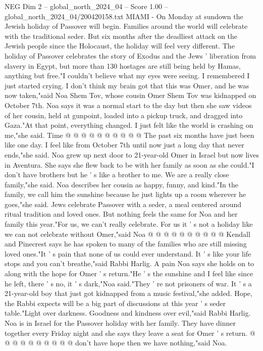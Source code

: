 \begin{textsample}{NEG Dim 2 – global\_north\_2024\_04 – Score 1.00 – global\_north\_2024\_04/200420158.txt}  \label{ex:f2_neg_282}
MIAMI - On Monday at sundown the Jewish holiday of Passover will begin.
Families around the world will celebrate with the traditional seder.
But six months after the deadliest attack on the Jewish people since the Holocaust, the holiday will feel very different.
The holiday of Passover celebrates the story of Exodus and the Jews ' liberation from slavery in Egypt, but more than 130 hostages are still being held by Hamas, anything but free."I couldn't believe what my eyes were seeing.
I remembered I just started crying.
I don't think my brain got that this was Omer, and he was now taken,"said Noa Shem Tov, whose cousin Omer Shem Tov was kidnapped on October 7th.
Noa says it was a normal start to the day but then she saw videos of her cousin, held at gunpoint, loaded into a pickup truck, and dragged into Gaza."At that point, everything changed.
I just felt like the world is crashing on me,"she said.
Time @ @ @ @ @ @ @ @ @ @ The past six months have just been like one day.
I feel like from October 7th until now just a long day that never ends,"she said.
Noa grew up next door to 21-year-old Omer in Israel but now lives in Aventura.
She says she flew back to be with her family as soon as she could."I don't have brothers but he ' s like a brother to me.
We are a really close family,"she said.
Noa describes her cousin as happy, funny, and kind."In the family, we call him the sunshine because he just lights up a room wherever he goes,"she said.
Jews celebrate Passover with a seder, a meal centered around ritual tradition and loved ones.
But nothing feels the same for Noa and her family this year."For us, we can't really celebrate.
For us it ' s not a holiday like we can not celebrate without Omer,"said Noa @ @ @ @ @ @ @ @ @ @ Kendall and Pinecrest says he has spoken to many of the families who are still missing loved ones."It ' s pain that none of us could ever understand.
It ' s like your life stops and you can't breathe,"said Rabbi Harlig.
A pain Noa says she holds on to along with the hope for Omer ' s return."He ' s the sunshine and I feel like since he left, there ' s no, it ' s dark,"Noa said."They ' re not prisoners of war.
It ' s a 21-year-old boy that just got kidnapped from a music festival,"she added.
Hope, the Rabbi expects will be a big part of discussions at this year ' s seder table."Light over darkness.
Goodness and kindness over evil,"said Rabbi Harlig.
Noa is in Israel for the Passover holiday with her family.
They have dinner together every Friday night and she says they leave a seat for Omer ' s return. @ @ @ @ @ @ @ @ @ @ don't have hope then we have nothing,"said Noa.

\end{textsample}
